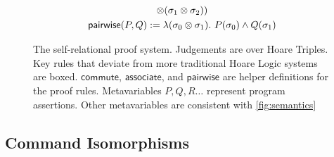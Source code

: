 \documentclass[p.tex]{subfiles}
\begin{document}
\begin{figure}
\begin{spreadlines}{5pt}
\begin{subequations}
\begin{gather*}
  \otimes (\sigma_1 \otimes \sigma_2))\\
  \textsf{pairwise}(P, Q) := \lambda(\sigma_0\otimes\sigma_1).~P(\sigma_0) \land Q(\sigma_1)
\end{gather*}
\end{subequations}
\end{spreadlines}
\caption{The self-relational proof system. Judgements are over
Hoare Triples. Key rules that deviate from more traditional Hoare
Logic systems are boxed.
$\textsf{commute}$, $\textsf{associate}$, and
$\textsf{pairwise}$ are helper definitions for the proof rules.
Metavariables $P, Q, R\ldots$ represent program
assertions. Other metavariables are consistent with
\cref{fig:semantics}}\label{fig:proof-system}
\end{figure}

\subsection{Command Isomorphisms}
\end{document}
